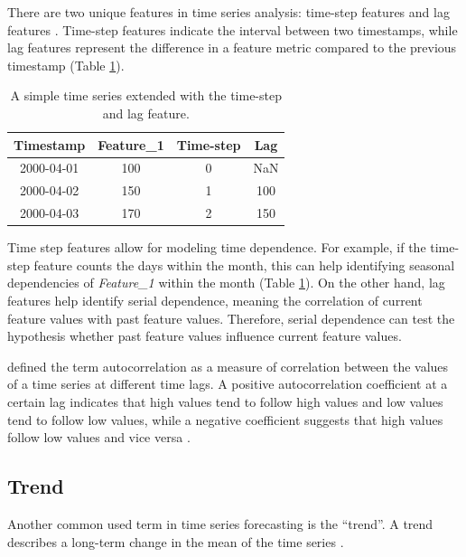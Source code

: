 There are two unique features in time series analysis: time-step features and lag
features \parencite{haben2023time}. Time-step features indicate the interval between
two timestamps, while lag features represent the difference in a feature metric
compared to the previous timestamp (Table \ref{tab:time_series_extended}).


\begin{table}[h]
    \centering
    \begin{tabular}{|c|c|c|c|}
        \hline
        \textbf{Timestamp} & \textbf{Feature\_1} & \textbf{Time-step} & \textbf{Lag} \\
        \hline
        2000-04-01         & 100                 & 0                  & NaN          \\
        \hline
        2000-04-02         & 150                 & 1                  & 100          \\
        \hline
        2000-04-03         & 170                 & 2                  & 150          \\
        \hline
    \end{tabular}
    \caption{A simple time series extended with the time-step and lag feature.}
    \label{tab:time_series_extended}
\end{table}

Time step features allow for modeling time dependence. For example, if the time-step
feature counts the days within the month, this can help identifying seasonal
dependencies of \textit{Feature\_1} within the month (Table \ref{tab:time_series_extended}).
On the other hand, lag features help identify serial dependence, meaning the correlation of
current feature values with past feature values. Therefore, serial dependence can test the
hypothesis whether past feature values influence current feature values.

\textcite{box2015time} defined the term autocorrelation as a measure of correlation
between the values of a time series at different time lags. A positive autocorrelation
coefficient at a certain lag indicates that high values tend to follow high values and
low values tend to follow low values, while a negative coefficient suggests that high
values follow low values and vice versa \parencite[ch. 2]{box2015time}.

\subsection{Trend}
Another common used term in time series forecasting is the ``trend''. A trend describes a long-term change in the mean of the time series \parencite[ch. 5]{haben2023time}.

